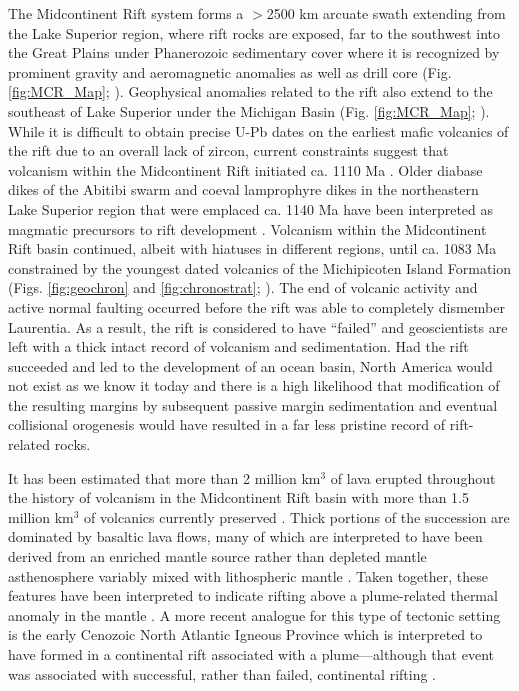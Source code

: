 \documentclass[11pt,letterpaper]{article}
\begin{document}
The Midcontinent Rift system forms a $>$2500 km arcuate swath extending from the Lake Superior region, where rift rocks are exposed, far to the southwest into the Great Plains under Phanerozoic sedimentary cover where it is recognized by prominent gravity and aeromagnetic anomalies as well as drill core (Fig. \ref{fig:MCR_Map}; \citealp{Van-Schmus1985a, Van-Schmus1992a}). Geophysical anomalies related to the rift also extend to the southeast of Lake Superior under the Michigan Basin (Fig. \ref{fig:MCR_Map}; \citealp{Keller1983a}). While it is difficult to obtain precise U-Pb dates on the earliest mafic volcanics of the rift due to an overall lack of zircon, current constraints suggest that volcanism within the Midcontinent Rift initiated ca. 1110 Ma \citep{Davis1985a, Heaman2007a}. Older diabase dikes of the Abitibi swarm and coeval lamprophyre dikes in the northeastern Lake Superior region that were emplaced ca. 1140 Ma have been interpreted as magmatic precursors to rift development \citep{Queen1996a,Piispa2018a}. Volcanism within the Midcontinent Rift basin continued, albeit with hiatuses in different regions, until ca. 1083 Ma constrained by the youngest dated volcanics of the Michipicoten Island Formation (Figs. \ref{fig:geochron} and \ref{fig:chronostrat}; \citealp{Fairchild2017a}). The end of volcanic activity and active normal faulting occurred before the rift was able to completely dismember Laurentia. As a result, the rift is considered to have ``failed'' and geoscientists are left with a thick intact record of volcanism and sedimentation. Had the rift succeeded and led to the development of an ocean basin, North America would not exist as we know it today and there is a high likelihood that modification of the resulting margins by subsequent passive margin sedimentation and eventual collisional orogenesis would have resulted in a far less pristine record of rift-related rocks.

It has been estimated that more than 2 million km$^{3}$ of lava erupted throughout the history of volcanism in the Midcontinent Rift basin with more than 1.5 million km$^{3}$ of volcanics currently preserved \citep{Cannon1992b}. Thick portions of the succession are dominated by basaltic lava flows, many of which are interpreted to have been derived from an enriched mantle source rather than depleted mantle asthenosphere variably mixed with lithospheric mantle \citep{Shirey1997a}. Taken together, these features have been interpreted to indicate rifting above a plume-related thermal anomaly in the mantle \citep{Hutchinson1990a}. A more recent analogue for this type of tectonic setting is the early Cenozoic North Atlantic Igneous Province which is interpreted to have formed in a continental rift associated with a plume---although that event was associated with successful, rather than failed, continental rifting \citep{Hutchinson1990a, Saunders1997a}.
\end{document}

